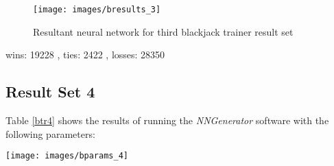\begin{figure}[h!]
  \centering
  \texttt{[image: images/bresults\_3]}
  \caption{Resultant neural network for third blackjack trainer result set}
  \label{bresults_3}
\end{figure}

wins:  19228 , ties:  2422 , losses:  28350

\subsection{Result Set 4}
Table \ref{btr4} shows the results of running the {\it NNGenerator} software with the following parameters:

\begin{center}
\texttt{[image: images/bparams\_4]}
\end{center}


